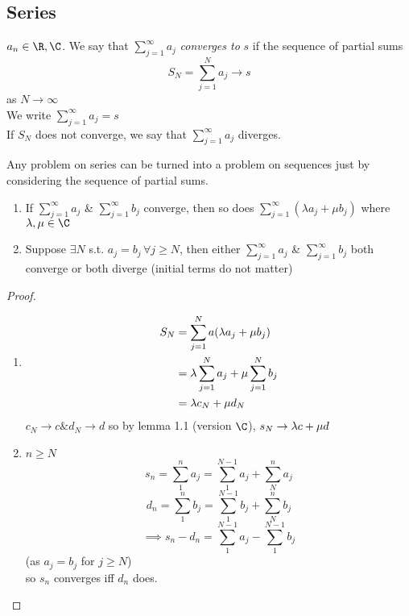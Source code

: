 \subsection{Series}
\begin{definition}
$a_n \in \R, \C$. We say that $\sum\limits_{j=1}^\infty a_j$ \emph{converges to} $s$ if the sequence of partial sums
\[S_N = \sum\limits_{j=1}^N a_j \to s\]
as $N \to \infty$\\
We write $\sum\limits_{j=1}^\infty a_j = s$\\
If $S_N$ does not converge, we say that $\sum\limits_{j=1}^\infty a_j$ diverges.
\end{definition}
\begin{remark}
Any problem on series can be turned into a problem on sequences just by considering the sequence of partial sums.
\end{remark}

\begin{lemma}
\hfill{ }
\begin{enumerate}
    \item If $\sum\limits_{j=1}^\infty a_j$ \& $\sum\limits_{j=1}^\infty b_j$ converge, then so does $\sum\limits_{j=1}^\infty (\lambda a_j + \mu b_j)$ where $\la, \mu \in \C$
    \item Suppose $\exists N$ s.t. $a_j = b_j\, \forall j \geq N$, then either $\sum\limits_{j=1}^\infty a_j$ \& $\sum\limits_{j=1}^\infty b_j$ both converge or both diverge (initial terms do not matter)
\end{enumerate}
\begin{proof}
\hfill{ }
\begin{enumerate}
    \item \begin{align*}
        S_N &= \sum\limits_{j=1}^N a(\lambda a_j + \mu b_j)\\
        &= \lambda \sum\limits_{j=1}^N a_j + \mu \sum\limits_{j=1}^N b_j\\
        &= \lambda c_N + \mu d_N
    \end{align*}
    $c_N \to c \& d_N \to d$ so by lemma 1.1 (version $\C$), $s_N \to \lambda c + \mu d$
    \item $n \geq N$
    \[s_n = \sum_1^n a_j = \sum_1^{N-1}a_j + \sum_N^n a_j\]
    \[d_n = \sum_1^n b_j = \sum_1^{N-1}b_j + \sum_N^n b_j\]
    \[\implies s_n - d_n = \sum_1^{N-1}a_j - \sum_1^{N-1}b_j\]
    (as $a_j = b_j$ for $j \geq N$)\\
    so $s_n$ converges iff $d_n$ does.
\end{enumerate}
\end{proof}
\end{lemma}
